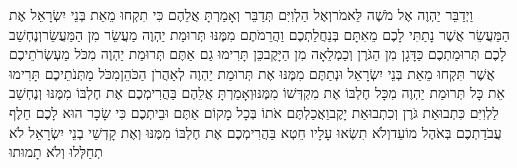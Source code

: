 \documentclass[../main/main.tex]{subfiles}
\begin{document}
\begin{multicols}{\ncols}
וַיְדַבֵּר יַהְוֶה אֶל מֹשֶׁה לֵּאמֹר\PreVerseSpace{}וְאֶל הַלְוִיִּם תְּדַבֵּר וְאָמַרְתָּ אֲלֵהֶם כִּי תִקְחוּ מֵאֵת בְּנֵי יִשְׂרָאֵל אֶת הַמַּעֲשֵׂר אֲשֶׁר נָתַתִּי לָכֶם מֵאִתָּם בְּנַחֲלַתְכֶם וַהֲרֵמֹתֶם מִמֶּנּוּ תְּרוּמַת יַהְוֶה מַעֲשֵׂר מִן הַמַּעֲשֵׂר\PreVerseSpace{}וְנֶחְשַׁב לָכֶם תְּרוּמַתְכֶם כַּדָּגָן מִן הַגֹּרֶן וְכַמְלֵאָה מִן הַיָּקֶב\PreVerseSpace{}כֵּן תָּרִימוּ גַם אַתֶּם תְּרוּמַת יַהְוֶה מִכֹּל מַעְשְׂרֹתֵיכֶם אֲשֶׁר תִּקְחוּ מֵאֵת בְּנֵי יִשְׂרָאֵל וּנְתַתֶּם מִמֶּנּוּ אֶת תְּרוּמַת יַהְוֶה לְאַהֲרֹן הַכֹּהֵן\PreVerseSpace{}מִכֹּל מַתְּנֹתֵיכֶם תָּרִימוּ אֵת כָּל תְּרוּמַת יַהְוֶה מִכָּל חֶלְבּוֹ אֶת מִקְדְּשׁוֹ מִמֶּנּוּ\PreVerseSpace{}וְאָמַרְתָּ אֲלֵהֶם בַּהֲרִימְכֶם אֶת חֶלְבּוֹ מִמֶּנּוּ וְנֶחְשַׁב לַלְוִיִּם כִּתְבוּאַת גֹּרֶן וְכִתְבוּאַת יָקֶב\PreVerseSpace{}וַאֲכַלְתֶּם אֹתוֹ בְּכָל מָקוֹם אַתֶּם וּבֵיתְכֶם כִּי שָׂכָר הוּא לָכֶם חֵלֶף עֲבֹדַתְכֶם בְּאֹהֶל מוֹעֵד\PreVerseSpace{}וְלֹא תִשְׂאוּ עָלָיו חֵטְא בַּהֲרִימְכֶם אֶת חֶלְבּוֹ מִמֶּנּוּ וְאֶת קָדְשֵׁי בְנֵי יִשְׂרָאֵל לֹא תְחַלְּלוּ וְלֹא תָמוּתוּ\OpenSection{}\par

\end{multicols}
\end{document}
